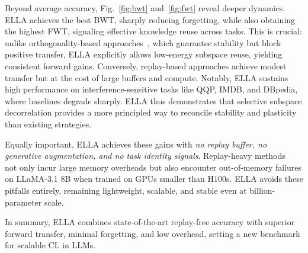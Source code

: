 \documentclass[11pt]{article}
\begin{document}
Beyond average accuracy, Fig.~\ref{fig:bwt} and~\ref{fig:fwt} reveal deeper dynamics. ELLA achieves the best BWT, sharply reducing forgetting, while also obtaining the highest FWT, signaling effective knowledge reuse across tasks. This is crucial: unlike orthogonality-based approaches~\cite{wang2023orthogonal, qiao2024learn}, which guarantee stability but block positive transfer, ELLA explicitly allows low-energy subspace reuse, yielding consistent forward gains. Conversely, replay-based approaches achieve modest transfer but at the cost of large buffers and compute. Notably, ELLA sustains high performance on interference-sensitive tasks like QQP, IMDB, and DBpedia, where baselines degrade sharply. ELLA thus demonstrates that selective subspace decorrelation provides a more principled way to reconcile stability and plasticity than existing strategies. 

Equally important, ELLA achieves these gains with \emph{no replay buffer, no generative augmentation, and no task identity signals}. Replay-heavy methods~\cite{liao2025data, feng2025recurrent} not only incur large memory overheads but also encounter out-of-memory failures on LLaMA-3.1 8B when trained on GPUs smaller than H$100$s. ELLA avoids these pitfalls entirely, remaining lightweight, scalable, and stable even at billion-parameter scale.

In summary, ELLA combines state-of-the-art replay-free accuracy with superior forward transfer, minimal forgetting, and low overhead, setting a new benchmark for scalable CL in LLMs.

\end{document}
